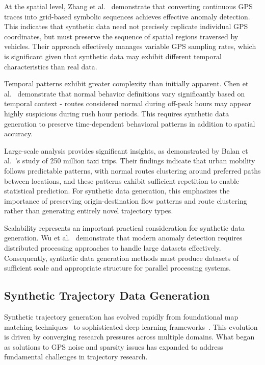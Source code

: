 \documentclass[runningheads]{llncs}
\begin{document}
At the spatial level, Zhang et al.~\cite{zhangIBATDetectingAnomalous2011} demonstrate that converting continuous GPS traces into grid-based symbolic sequences achieves effective anomaly detection. This indicates that synthetic data need not precisely replicate individual GPS coordinates, but must preserve the sequence of spatial regions traversed by vehicles. Their approach effectively manages variable GPS sampling rates, which is significant given that synthetic data may exhibit different temporal characteristics than real data.

Temporal patterns exhibit greater complexity than initially apparent. Chen et al.~\cite{chenTemporalContextAwareRoute2021} demonstrate that normal behavior definitions vary significantly based on temporal context - routes considered normal during off-peak hours may appear highly suspicious during rush hour periods. This requires synthetic data generation to preserve time-dependent behavioral patterns in addition to spatial accuracy.

Large-scale analysis provides significant insights, as demonstrated by Balan et al.~\cite{balanRealTimeTripInformation2011}'s study of 250 million taxi trips. Their findings indicate that urban mobility follows predictable patterns, with normal routes clustering around preferred paths between locations, and these patterns exhibit sufficient repetition to enable statistical prediction. For synthetic data generation, this emphasizes the importance of preserving origin-destination flow patterns and route clustering rather than generating entirely novel trajectory types.

Scalability represents an important practical consideration for synthetic data generation. Wu et al.~\cite{wuSafetySpatialFeature2024} demonstrate that modern anomaly detection requires distributed processing approaches to handle large datasets effectively. Consequently, synthetic data generation methods must produce datasets of sufficient scale and appropriate structure for parallel processing systems.

\subsection{Synthetic Trajectory Data Generation}
\label{sec:generation-review}

Synthetic trajectory generation has evolved rapidly from foundational map matching techniques~\cite{newsonHiddenMarkovMap2009} to sophisticated deep learning frameworks~\cite{caoGeneratingMobilityTrajectories2021,wangGTGGeneralizableTrajectory2025}. This evolution is driven by converging research pressures across multiple domains. What began as solutions to GPS noise and sparsity issues has expanded to address fundamental challenges in trajectory research.
\end{document}

